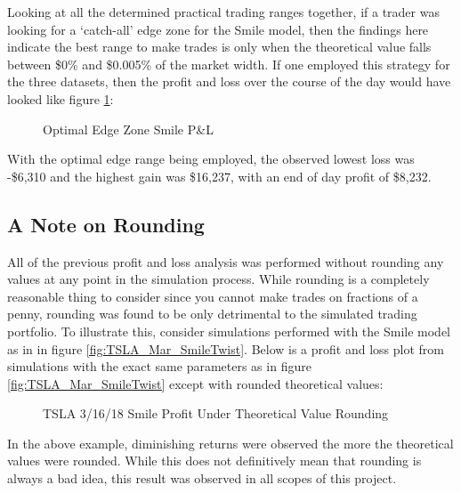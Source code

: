 \documentclass[12pt, a4paper, notitlepage]{article}
\numberwithin{equation}{subsection}
\numberwithin{figure}{subsection}
\numberwithin{table}{subsection}
\newcommand{\img}[3]
{
    \begin{figure}[H]
	\caption{#1}
	\centerline{\fbox{\texttt{[image: \#2]}}}
	\label{#3}
    \end{figure}
}
\begin{document}
Looking at all the determined practical trading ranges together, if a trader was looking for a `catch-all' edge zone for the Smile model, then the findings here indicate the best range to make trades is only when the theoretical value falls between \$0\% and \$0.005\% of the market width.  If one employed this strategy for the three datasets, then the profit and loss over the course of the day would have looked like figure \ref{fig:SmileOptimalPnL}:

\img{Optimal Edge Zone Smile P\&L}{SmileOptimalPnL}{fig:SmileOptimalPnL}

With the optimal edge range being employed, the observed lowest loss was -\$6,310 and the highest gain was \$16,237, with an end of day profit of \$8,232.

\subsection{A Note on Rounding}
All of the previous profit and loss analysis was performed without rounding any values at any point in the simulation process.  While rounding is a completely reasonable thing to consider since you cannot make trades on fractions of a penny, rounding was found to be only detrimental to the simulated trading portfolio.  To illustrate this, consider simulations performed with the Smile model as in in figure \ref{fig:TSLA_Mar_SmileTwist}.  Below is a profit and loss plot from simulations with the exact same parameters as in figure \ref{fig:TSLA_Mar_SmileTwist} except with rounded theoretical values:

\img{TSLA 3/16/18 Smile Profit Under Theoretical Value Rounding}{TSLA_Mar_SmileRounding}{fig:SmileRounding}

In the above example, diminishing returns were observed the more the theoretical values were rounded.  While this does not definitively mean that rounding is always a bad idea, this result was observed in all scopes of this project.

\label{subsec:ANoteOnRounding}

\newpage
\end{document}
